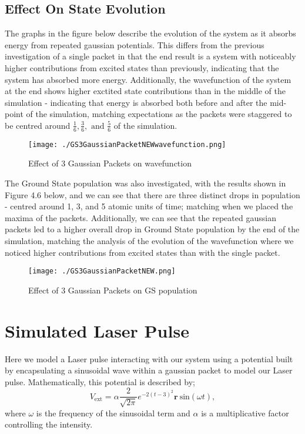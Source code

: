 \subsection{Effect On State Evolution}
The graphs in the figure below describe the evolution of the system as it absorbs energy from repeated gaussian potentials. This differs from the previous investigation of a single packet in that the end result is a system with noticeably higher contributions from excited states than previously, indicating that the system has absorbed more energy. Additionally, the wavefunction of the system at the end shows higher exctited state contributions than in the middle of the simulation - indicating that energy is absorbed both before and after the mid-point of the simulation, matching expectations as the packets were staggered to be centred around $\frac{1}{6}, \frac{3}{6}, \text{ and }\frac{5}{6}$ of the simulation.
\begin{figure}[H]
          \texttt{[image: ./GS3GaussianPacketNEWwavefunction.png]}
          \centering
          \caption{Effect of 3 Gaussian Packets on wavefunction}
\end{figure}

The Ground State population was also investigated, with the results shown in Figure 4.6 below, and we can see that there are three distinct drops in population - centred around 1, 3, and 5 atomic units of time; matching when we placed the maxima of the packets. Additionally, we can see that the repeated gaussian packets led to a higher overall drop in Ground State population by the end of the simulation, matching the analysis of the evolution of the wavefunction where we noticed higher contributions from excited states than with the single packet.
\begin{figure}[H]
          \texttt{[image: ./GS3GaussianPacketNEW.png]}
          \centering
          \caption{Effect of 3 Gaussian Packets on GS population}
\end{figure}

\section{Simulated Laser Pulse}

Here we model a Laser pulse interacting with our system using a potential built by encapsulating a sinusoidal wave within a gaussian packet to model our Laser pulse. Mathematically, this potential is described by;
$$
V_{\text{ext}} = \alpha \frac{2}{\sqrt{2\pi}}e^{-2\left(t-3\right)^{2}}\mathbf{r}\ \text{sin}\left(\omega t\right),
$$
where $\omega$ is the frequency of the sinusoidal term and $\alpha$ is a multiplicative factor controlling the intensity.

